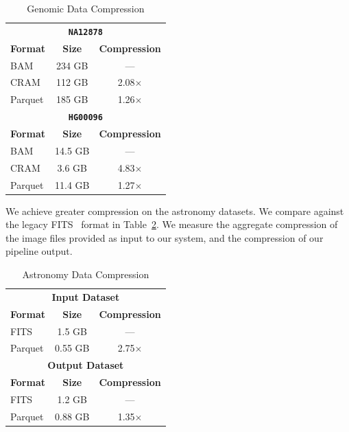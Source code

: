 \documentclass{acm_proc_article-sp}
\begin{document}
\begin{table}[h]
\caption{Genomic Data Compression}
\label{tab:genomic-compression}
\begin{center}
\begin{tabular}{ l c c }
\hline
\multicolumn{3}{c}{\bf \texttt{NA12878}} \\
\bf Format & \bf Size & \bf Compression \\
\hline
\hline
BAM & 234 GB & --- \\
CRAM & 112 GB & 2.08$\times$ \\
Parquet & 185 GB & 1.26$\times$ \\
\hline
\multicolumn{3}{c}{\bf \texttt{HG00096}} \\
\bf Format & \bf Size & \bf Compression \\
\hline
\hline
BAM & 14.5 GB & --- \\
CRAM & 3.6 GB & 4.83$\times$ \\
Parquet & 11.4 GB & 1.27$\times$ \\
\hline
\end{tabular}
\end{center}
\end{table}

We achieve greater compression on the astronomy datasets. We compare against the legacy FITS~\cite{wells81}
format in Table~\ref{tab:astro-compression}. We measure the aggregate compression of the image files provided
as input to our system, and the compression of our pipeline output.

\begin{table}[h]
\caption{Astronomy Data Compression}
\label{tab:astro-compression}
\begin{center}
\begin{tabular}{ l c c }
\hline
\multicolumn{3}{c}{\bf Input Dataset} \\
\bf Format & \bf Size & \bf Compression \\
\hline
\hline
FITS & 1.5 GB & --- \\
Parquet & 0.55 GB & 2.75$\times$ \\
\hline
\multicolumn{3}{c}{\bf Output Dataset} \\
\bf Format & \bf Size & \bf Compression \\
\hline
\hline
FITS & 1.2 GB & --- \\
Parquet & 0.88 GB & 1.35$\times$ \\
\hline
\end{tabular}
\end{center}
\end{table}
\end{document}
